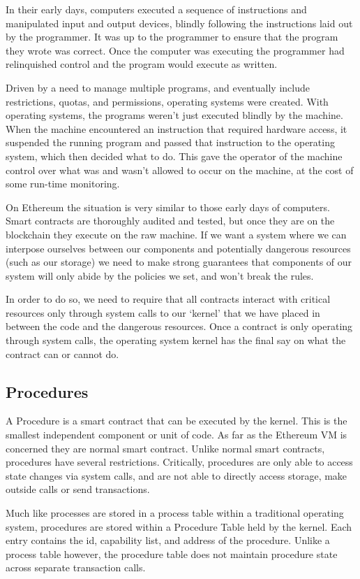 \documentclass[english,a4paper]{article}
\begin{document}
In their early days, computers executed a sequence of instructions and
manipulated input and output devices, blindly following the instructions
laid out by the programmer. It was up to the programmer to ensure that
the program they wrote was correct. Once the computer was executing the
programmer had relinquished control and the program would execute as
written.

Driven by a need to manage multiple programs, and eventually include
restrictions, quotas, and permissions, operating systems were created.
With operating systems, the programs weren't just executed blindly by
the machine. When the machine encountered an instruction that required
hardware access, it suspended the running program and passed that
instruction to the operating system, which then decided what to do. This
gave the operator of the machine control over what was and wasn't
allowed to occur on the machine, at the cost of some run-time
monitoring.

On Ethereum the situation is very similar to those early days of
computers. Smart contracts are thoroughly audited and tested, but once
they are on the blockchain they execute on the raw machine. If we want a
system where we can interpose ourselves between our components and
potentially dangerous resources (such as our storage) we need to make
strong guarantees that components of our system will only abide by the policies
we set, and won't break the rules.

In order to do so, we need to require that all contracts interact with critical
resources only through system calls to our `kernel' that we have placed in
between the code and the dangerous resources. Once a contract is only operating
through system calls, the operating system kernel has the final say on what the
contract can or cannot do.

\subsection{Procedures}\label{procedures}
A Procedure is a smart contract that can be executed by the kernel. This is the
smallest independent component or unit of code. As far as the Ethereum VM is
concerned they are normal smart contract.
Unlike normal smart contracts, procedures have several restrictions.
Critically, procedures are only able to access state changes via system
calls, and are not able to directly access storage, make outside calls
or send transactions.

Much like processes are stored in a process table within a traditional
operating system, procedures are stored within a Procedure Table held by the
kernel. Each
entry contains the id, capability list, and address of the procedure.
Unlike a process table however, the procedure table does not maintain
procedure state across separate transaction calls.
\end{document}
